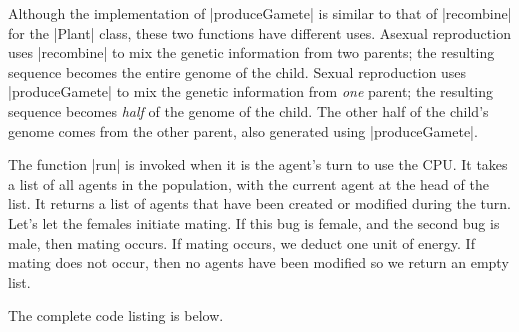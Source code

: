 Although the implementation of |produceGamete| is similar to that
of |recombine| for the |Plant| class, 
these two functions have different uses.
Asexual reproduction uses |recombine| to mix the genetic
information from two parents;
the resulting sequence becomes the entire genome of the child.
Sexual reproduction uses |produceGamete| to mix the genetic information
from \emph{one} parent;
the resulting sequence becomes \emph{half} of the genome of the child.
The other half of the child's genome comes from the other parent,
also generated using |produceGamete|.

The function |run| is invoked when it is the agent's turn to use the CPU.
It takes a list of all agents in the population, with the current agent at the head of the list.
It returns a list of agents that have been created or modified during the turn.
Let's let the females initiate mating.
If this bug is female, and the second bug is male, then mating occurs.
If mating occurs, we deduct one unit of energy.
If mating does not occur, then no agents have been modified so we return an empty list.


The complete code listing is below.


